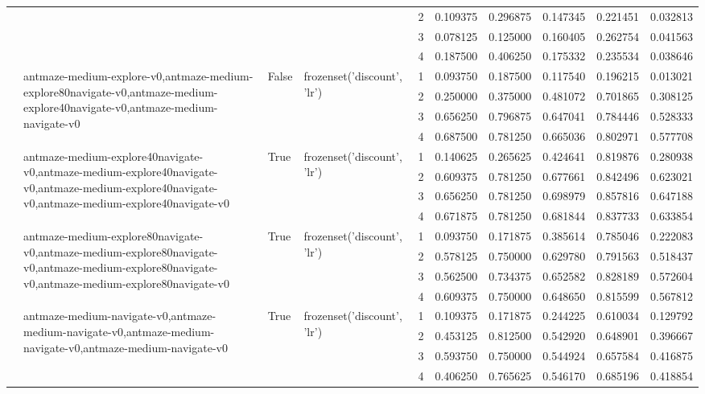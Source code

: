 \begin{tabular}{lllllrrrrr}
 &  &  &  & 2 & 0.109375 & 0.296875 & 0.147345 & 0.221451 & 0.032813 \\
 &  &  &  & 3 & 0.078125 & 0.125000 & 0.160405 & 0.262754 & 0.041563 \\
 &  &  &  & 4 & 0.187500 & 0.406250 & 0.175332 & 0.235534 & 0.038646 \\
\cline{2-10} \cline{3-10} \cline{4-10}
 & \multirow[t]{4}{*}{antmaze-medium-explore-v0,antmaze-medium-explore80navigate-v0,antmaze-medium-explore40navigate-v0,antmaze-medium-navigate-v0} & \multirow[t]{4}{*}{False} & \multirow[t]{4}{*}{frozenset({'discount', 'lr'})} & 1 & 0.093750 & 0.187500 & 0.117540 & 0.196215 & 0.013021 \\
 &  &  &  & 2 & 0.250000 & 0.375000 & 0.481072 & 0.701865 & 0.308125 \\
 &  &  &  & 3 & 0.656250 & 0.796875 & 0.647041 & 0.784446 & 0.528333 \\
 &  &  &  & 4 & 0.687500 & 0.781250 & 0.665036 & 0.802971 & 0.577708 \\
\cline{2-10} \cline{3-10} \cline{4-10}
 & \multirow[t]{4}{*}{antmaze-medium-explore40navigate-v0,antmaze-medium-explore40navigate-v0,antmaze-medium-explore40navigate-v0,antmaze-medium-explore40navigate-v0} & \multirow[t]{4}{*}{True} & \multirow[t]{4}{*}{frozenset({'discount', 'lr'})} & 1 & 0.140625 & 0.265625 & 0.424641 & 0.819876 & 0.280938 \\
 &  &  &  & 2 & 0.609375 & 0.781250 & 0.677661 & 0.842496 & 0.623021 \\
 &  &  &  & 3 & 0.656250 & 0.781250 & 0.698979 & 0.857816 & 0.647188 \\
 &  &  &  & 4 & 0.671875 & 0.781250 & 0.681844 & 0.837733 & 0.633854 \\
\cline{2-10} \cline{3-10} \cline{4-10}
 & \multirow[t]{4}{*}{antmaze-medium-explore80navigate-v0,antmaze-medium-explore80navigate-v0,antmaze-medium-explore80navigate-v0,antmaze-medium-explore80navigate-v0} & \multirow[t]{4}{*}{True} & \multirow[t]{4}{*}{frozenset({'discount', 'lr'})} & 1 & 0.093750 & 0.171875 & 0.385614 & 0.785046 & 0.222083 \\
 &  &  &  & 2 & 0.578125 & 0.750000 & 0.629780 & 0.791563 & 0.518437 \\
 &  &  &  & 3 & 0.562500 & 0.734375 & 0.652582 & 0.828189 & 0.572604 \\
 &  &  &  & 4 & 0.609375 & 0.750000 & 0.648650 & 0.815599 & 0.567812 \\
\cline{2-10} \cline{3-10} \cline{4-10}
 & \multirow[t]{4}{*}{antmaze-medium-navigate-v0,antmaze-medium-navigate-v0,antmaze-medium-navigate-v0,antmaze-medium-navigate-v0} & \multirow[t]{4}{*}{True} & \multirow[t]{4}{*}{frozenset({'discount', 'lr'})} & 1 & 0.109375 & 0.171875 & 0.244225 & 0.610034 & 0.129792 \\
 &  &  &  & 2 & 0.453125 & 0.812500 & 0.542920 & 0.648901 & 0.396667 \\
 &  &  &  & 3 & 0.593750 & 0.750000 & 0.544924 & 0.657584 & 0.416875 \\
 &  &  &  & 4 & 0.406250 & 0.765625 & 0.546170 & 0.685196 & 0.418854 \\
\cline{1-10} \cline{2-10} \cline{3-10} \cline{4-10}
\bottomrule
\end{tabular}
